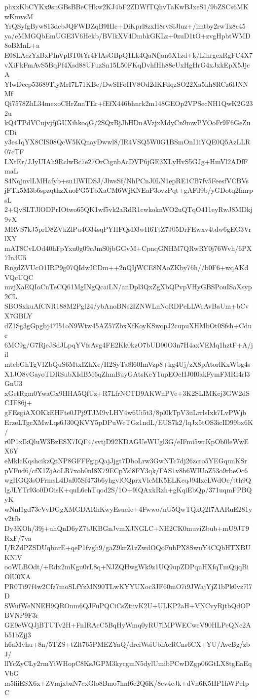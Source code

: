 phxxKbCYKx9snGBsBBeCHkw2KJ4bF2ZDWfTQhvTaKwBJxeS1/9bZSCs6MKwKmvsM
YrQSyfgByw813dcbJQFWDZqB9HIc+DiKprl8zxH8rvSiJluz+/imtby2rwTz8c45
ya/eMMGQbEmUGE3V6Hekb/BVlkXV4DmbkGKLz+0zuD1tO+zvgHpbtWMD8oBMnL+a
E08LAczYxBxPInVpBT0tYr4FlAsGBpQ1Lk4QaNfjan6X1zd+k/LihrgexRgFC4X7
vXiFkFmAvS5BqPf4Xsd88UFuzSn15L50FKqDvhfHh88eUxHgHrG4xJxkEpX5JjcA
YlwDcep53689TiyMrI7L71KBe/DwSIFoHV8Od2dKFdqzSO22Xa5kh8RCz6lJNNMf
Qi7578ZhL34mexoCHrZnaTEr+fEfX446bhnrk2m148GEOp2VPSecNH1QwK2G232u
kQ4TPdVCujvjfjGUXihkoqG/2SQxBjJhHDnAVzjxMdyCn9mwPYOoFr9F6GeZuCDi
y3esJqYX8CIS08QcW5KQnayDwwl8/IR4VSQ5W0G1BSmOnI1iYQE0Q5AzLLR07cTF
LXtEr/JJyUIAh9RclwBc7e27OrCignbAcDVP6jGE3XLyHvS5GJg+HmVl2ADfFmaL
S4NqjnvlLMHafyb+su1lWIDSJ/JlwsSf/NhPCnJ0LN1epRE1CB7fv5FeesfVCBVs
jFTk5M3b6spzqthzXuoPG5TbXaCM6WjKNEaP3ovzPqt+gAFd9b/yGDotq2fmrpsL
2+QvSLTJlODPrIOtwo65QK1wf5vk2aRdR1cwkoknWO2uQTqO411eyRwJ8MDkj9vX
MRVS7kJ5prD8ZVkZlPu4O34sqPYHFQsD3wH6TtZ7J05DrFEwxv4tdw6gEG3VrlXY
mAT8CvLOd40hFpYxu0g09cJmS0jbGGvM+CpnqGNHM7QRwRY0j76Wvh/6PX7In3U5
RngdZVUcO1IRP9g07QIdwICDm++2nQIjWCE8NAoZKby76h//b0F6+wqAKdVQcUQC
mvjXaEQIoCnTeCQ61MgINgQcaiLN/anDpl3QxZgXbQPvpVHyGBSPouISaXsyp2CL
SBOSxkuAfCNR188M2Pgl24/ybAnoBNs2IZNWLnNoRDPeLLWrAvBaUm+bCvX7GBLY
dZ1Sg3gGpgbj47I51oN9Wtw45AZ57ZbxXfKoyKSwopJ2cupuXHMbOt0Sfsh+Cduc
6MC9g/G7RjeJSdJLpqYVfsAvg4FE2Kk0kzO7bUD90O3n7H4axVEMq1hztF+A/jil
mtcbGhTgVIZbQuS6MtxIZhXe/H2SyTa8l60ImVzp8+kg4Uj/zX8pAtorlKxWbg4s
X1JO8vGayoTDRSubXIdBM6qZhmBuyGAtsKeY1upEOeHJ0I0akFymFMRI4rl3GnU3
xGetRgm0YwaGx9HHA5QfUz+R7LfrNCTD9AKWnPVe+3K2SLIMKej3GW2dSCJF86j+
gFEsgiAXOKkEHFte0JPj9TJM9vLHY4w6Ui5t3/8pl0kTpV3iiLrrlsIxk7LvPWjb
ErzeLTgcXMwLqs6J30QKVY5pDPuWeTGz1ndL/EUS7k2/lqJx5tOS3icID99bx6K/
r0P1xIkQluW3BzESX7IQF4/svtjD92KDAGUeWUgl3G/eIFmi5wcKpOb0leWwEX6Y
eMklcKqshcikzQtNP8GFFFgipQajJjgt7DboLrw3GwNTc7dj26zcro5YEGqunKSr
pVFud6/cfX1ZjAoLR7xob0nl8X79ECpYsl8FY3qk/FAS1v8b6WIUoZ53o9rbeOc6
wgHGQ3sOFrmsL4Daf05Sf473b6yhgvlCQprxVlcMK5ELKcqJ94lxcLWdOc/tth9Q
lgJLYTr93o0DOisK+quL6ehTqod2S/1O+9lQAxkRzh+gKqiEbQp/371uqmFPBQyK
wNnl1gd73cVvDGgXMGDARhKwyEsueIe+4Fwwo/nU5QwTQxQ2I7AARuE281yv2tfb
Dy3KOh/39j+uhQnD6yZ7tJKBGnJvmXJNGLC+NH2CK0muviZbub+mU9JT9RxF/7va
I/RZdPZSDUqbnrE+qeP1fvgh9/gaZ9krZ1zZwdOQoFubPX8SwuY4CQbHTXBUKNlV
ooWLBOdt/+Rdx2mKgu0rL8q+NJZQHwgWk9z1UQ9upZDPquHXfqTmQijqBiOlU0XA
PR0Ti97f4w2Cfz7moSLfYzMN90TLwKYYUXoc3JF60mO7i9JWajYjZ1bPk0vz7l7D
SWufWeNNEH9QROnm6QJFuPQCiCsZtnvK2U+ULKP2aH+VNCvyRjtbQdOPBVNP9F3r
GE9eWQJjBTUTv2H+FnIRAcC5BqHyWmq0yRU7lMPWECwcV90HLPeQNc2Ab51bZjj3
h6aMvhu+8n/5TZS+tZlt765PMEZYaQ/dreiWsiUblAcRCns6CX+YU/AvcBg/zbJ/
llYcZyCLy2rmYiWHopC8KsJGPM3kycgmN5dylUmibPCwDZgp06GtLX8tgEaEqVbG
m5fiiESX6x+ZVmjxbzN7cxGlo8Bmo7hnf6c2Q6K/8cv4eJk+dVn6K5HP1hWPeIpC
